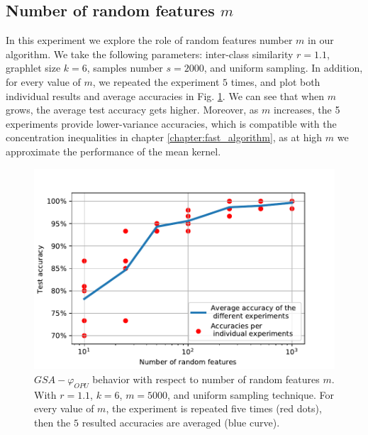 \subsection{Number of random features $m$}
In this experiment we explore the role of random features number $m$ in our algorithm. 
We take the following parameters: inter-class similarity $r=1.1$, graphlet size $k=6$, samples number $s=2000$, and uniform sampling.
In addition, for every value of $m$, we repeated the experiment $5$ times, and plot both individual results and average accuracies in Fig. \ref{fig:varying_random_features}. We can see that when $m$ grows, the average test accuracy gets higher. Moreover, as $m$ increases, the 5 experiments provide lower-variance accuracies, which is compatible with the concentration inequalities in chapter \ref{chapter:fast_algorithm}, as at high $m$ we approximate the performance of the mean kernel.

\begin{figure}[H]
\centering
\includegraphics[scale=0.6]{figs/LightON_adj_SBM_varying_RF.PDF}
\caption[$GSA-\varphi_{OPU}$ behavior with respect to number of random features $m$]{$GSA-\varphi_{OPU}$ behavior with respect to number of random features $m$. With $r=1.1$, $k=6$, $m=5000$, and uniform sampling technique. For every value of $m$, the experiment is repeated five times (red dots), then the $5$ resulted accuracies are averaged (blue curve).}
\label{fig:varying_random_features}
\end{figure}

